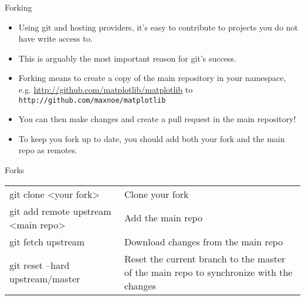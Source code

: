 \begin{frame}[t]{Forking}
  \begin{itemize}
    \item Using git and hosting providers, it's easy to contribute to projects you do not have write access to.

    \item This is arguably the most important reason for git's success.

    \item Forking means to create a copy of the main repository in your namespace, e.g. \url{http://github.com/matplotlib/matplotlib} to \texttt{http://github.com/maxnoe/matplotlib}

    \item You can then make changes and create a pull request in the main repository!

    \item To keep you fork up to date, you should add both your fork and the main repo as remotes.
  \end{itemize}
\end{frame}

\begin{frame}{Forks}
  \begin{tabu}{>{\ttfamily}l X[,L]}
    git clone <your fork>  & Clone your fork \\
    git add remote upstream <main repo>   & Add the main repo \\
    git fetch upstream   & Download changes from the main repo \\
    git reset --hard upstream/master & Reset the current branch to the master of the main repo to synchronize with the changes
  \end{tabu}
\end{frame}
